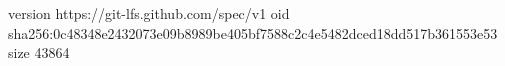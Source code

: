version https://git-lfs.github.com/spec/v1
oid sha256:0c48348e2432073e09b8989be405bf7588c2c4e5482dced18dd517b361553e53
size 43864
